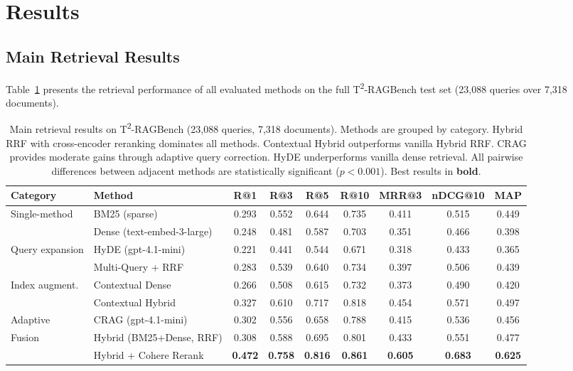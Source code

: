 \documentclass[11pt]{article}
\begin{document}
\section{Results}
\label{sec:results}

\subsection{Main Retrieval Results}
\label{sec:main_results}

Table~\ref{tab:main_results} presents the retrieval performance of all evaluated methods on the full T\textsuperscript{2}-RAGBench test set (23,088 queries over 7,318 documents).

\begin{table}[t]
\centering
\small
\begin{tabular}{llccccccc}
\toprule
\textbf{Category} & \textbf{Method} & \textbf{R@1} & \textbf{R@3} & \textbf{R@5} & \textbf{R@10} & \textbf{MRR@3} & \textbf{nDCG@10} & \textbf{MAP} \\
\midrule
\multirow{2}{*}{Single-method}
  & BM25 (sparse)               & 0.293 & 0.552 & 0.644 & 0.735 & 0.411 & 0.515 & 0.449 \\
  & Dense (text-embed-3-large)  & 0.248 & 0.481 & 0.587 & 0.703 & 0.351 & 0.466 & 0.398 \\
\midrule
\multirow{2}{*}{Query expansion}
  & HyDE (gpt-4.1-mini)        & 0.221 & 0.441 & 0.544 & 0.671 & 0.318 & 0.433 & 0.365 \\
  & Multi-Query + RRF           & 0.283 & 0.539 & 0.640 & 0.734 & 0.397 & 0.506 & 0.439 \\
\midrule
\multirow{2}{*}{Index augment.}
  & Contextual Dense            & 0.266 & 0.508 & 0.615 & 0.732 & 0.373 & 0.490 & 0.420 \\
  & Contextual Hybrid           & 0.327 & 0.610 & 0.717 & 0.818 & 0.454 & 0.571 & 0.497 \\
\midrule
Adaptive
  & CRAG (gpt-4.1-mini)         & 0.302 & 0.556 & 0.658 & 0.788 & 0.415 & 0.536 & 0.456 \\
\midrule
\multirow{2}{*}{Fusion}
  & Hybrid (BM25+Dense, RRF)    & 0.308 & 0.588 & 0.695 & 0.801 & 0.433 & 0.551 & 0.477 \\
  & Hybrid + Cohere Rerank      & \textbf{0.472} & \textbf{0.758} & \textbf{0.816} & \textbf{0.861} & \textbf{0.605} & \textbf{0.683} & \textbf{0.625} \\
\bottomrule
\end{tabular}
\caption{Main retrieval results on T\textsuperscript{2}-RAGBench (23,088 queries, 7,318 documents). Methods are grouped by category. Hybrid RRF with cross-encoder reranking dominates all methods. Contextual Hybrid outperforms vanilla Hybrid RRF. CRAG provides moderate gains through adaptive query correction. HyDE underperforms vanilla dense retrieval. All pairwise differences between adjacent methods are statistically significant ($p < 0.001$). Best results in \textbf{bold}.}
\label{tab:main_results}
\end{table}
\end{document}
